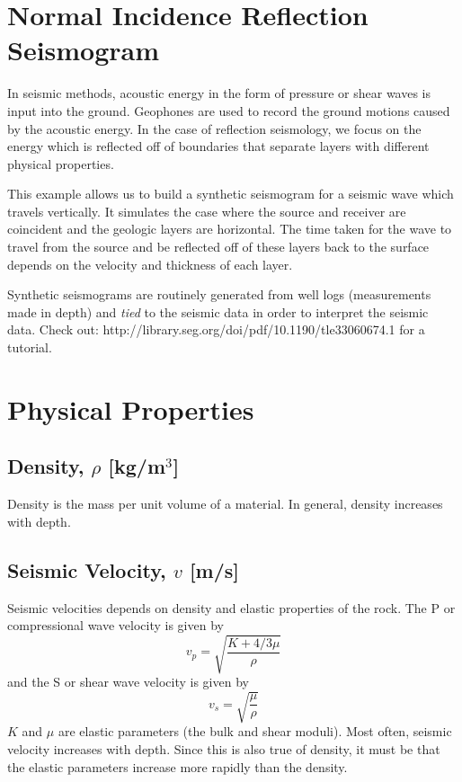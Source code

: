 \documentclass{article}[11pt,oneside]
\begin{document}

\section*{Normal Incidence Reflection Seismogram}
In seismic methods, acoustic energy in the form of pressure or shear waves is input into the ground.
Geophones are used to record the ground motions caused by the acoustic energy. In the case of reflection seismology, we focus on the energy which is reflected off of boundaries that separate layers with different physical properties.

This example allows us to build a synthetic seismogram for a seismic wave which travels vertically. It simulates the case where the source and receiver are coincident and the geologic layers are horizontal. The time taken for the wave to travel from the source and be reflected off of these layers back to the surface depends on the velocity and thickness of each layer.

Synthetic seismograms are routinely generated from well logs (measurements made in depth) and \emph{tied} to the seismic data in order to interpret the seismic data.
Check out: http://library.seg.org/doi/pdf/10.1190/tle33060674.1 for a tutorial.


\section*{Physical Properties}
\subsection*{Density, $\rho$ [kg/m$^3$]}
Density is the mass per unit volume of a material. In general, density increases with depth.

\subsection*{Seismic Velocity, $v$ [m/s]}
Seismic velocities depends on density and elastic properties of the rock. The P or compressional wave velocity is given by
$$v_p = \sqrt{\frac{K + 4/3\mu}{\rho}}$$
and the S or shear wave velocity is given by
$$v_s = \sqrt{\frac{\mu}{\rho}}$$
$K$ and $\mu$ are elastic parameters (the bulk and shear moduli). Most often, seismic velocity increases with depth. Since this is also true of density, it must be that the elastic parameters increase more rapidly than the density.
\end{document}
